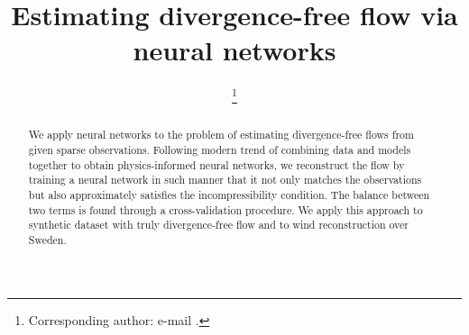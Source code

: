 \documentclass[pamm,a4paper,fleqn]{w-art}
\begin{document}

\TitleLanguage[EN]
\title[Divergence-free neural networks]{Estimating divergence-free flow via
  neural networks}

\author{ %
\footnote{Corresponding author:
  e-mail .}} 
\author{ }
\author{ }
\author{ }

\address[\inst{1}]{\CountryCode[DE]RWTH Aachen University, Pontdriesch 14--16,
  Aachen 52062, Germany}
\address[\inst{2}]{\CountryCode[SE]KTH Royal Institute of Technology,
  SE-100 44 Stockholm, Sweden}
\address[\inst{3}]{\CountryCode[SA]King Abdullah University of Science and
  Technology, Thuwal, 23955-6900, Saudi Arabia}
\AbstractLanguage[EN]
\begin{abstract}
We apply neural networks to the problem of estimating divergence-free flows from
given sparse observations.
Following modern trend of combining data and models together to obtain
physics-informed neural networks, we reconstruct the flow by training a neural
network in such manner that it not
only matches the observations but also approximately satisfies the
incompressibility condition.
The balance between two terms is found through a cross-validation procedure.
We apply this
approach to synthetic dataset with truly divergence-free flow and to wind
reconstruction over Sweden.
\end{abstract}
\maketitle                   %
\end{document}
